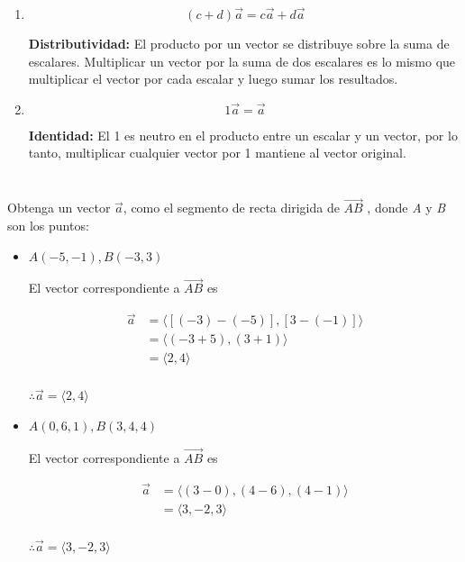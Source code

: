 \documentclass[12pt]{article}
\begin{document}
\begin{enumerate}
\item $$(c+d)\vec{a} = c\vec{a}+d\vec{a}$$
  
  \textbf{Distributividad:} El producto por un vector se distribuye sobre la suma de escalares. Multiplicar un vector por la suma de dos escalares es lo mismo que multiplicar el vector por cada escalar y luego sumar los resultados.
  
\item $$1\vec{a} = \vec{a}$$
  
  \textbf{Identidad:} El 1 es neutro en el producto entre un escalar y un vector, por lo tanto, multiplicar cualquier vector por 1 mantiene al vector original.
  
\end{enumerate}

\section{}

Obtenga un vector $\vec{a}$, como el segmento de recta dirigida de $\vec{AB}$ , donde \textit{A} y \textit{B} son los puntos:

\begin{itemize}
  
\item $A(-5,-1) , B(-3,3)$

  El vector correspondiente a $\vec{AB}$ es

  \begin{align*}
    \vec{a}
    &=
    \langle
    [(-3)-(-5)],
    [3-(-1)]
    \rangle \\
    &=
    \langle
    (-3+5),
    (3+1)
    \rangle \\
    &=
    \langle
    2,
    4
    \rangle \\
  \end{align*}

  $\therefore \vec{a} = \langle 2, 4 \rangle$
  
\item $A(0,6,1), B(3,4,4)$

  El vector correspondiente a $\vec{AB}$ es

  \begin{align*}
    \vec{a}
    &=
    \langle
    (3-0),
    (4-6),
    (4-1)
    \rangle \\
    &=
    \langle
    3,
    -2,
    3
    \rangle \\
  \end{align*}

  $\therefore \vec{a} = \langle 3, -2, 3 \rangle$
  
\end{itemize}
\end{document}
